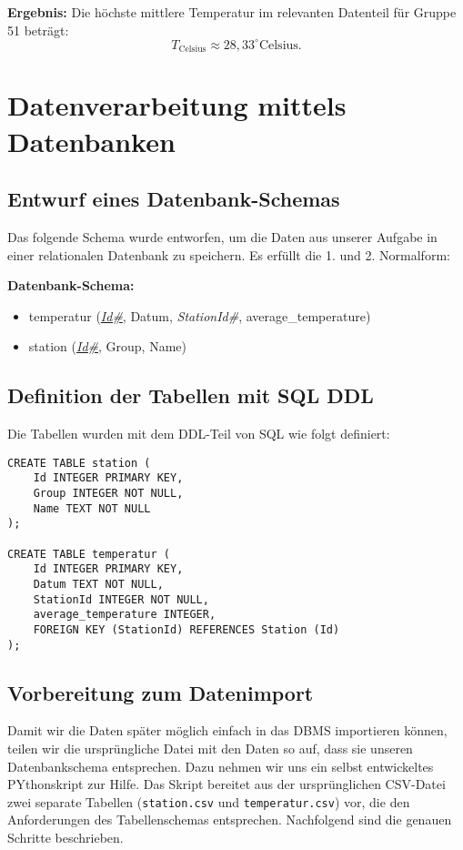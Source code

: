 \documentclass[a4paper,12pt]{article}
\begin{document}
\textbf{Ergebnis:}
Die höchste mittlere Temperatur im relevanten Datenteil für Gruppe 51 beträgt:
\[
T_{\text{Celsius}} \approx 28,33^\circ \text{Celsius}.
\]

\newpage

\section{Datenverarbeitung mittels Datenbanken}

\subsection{Entwurf eines Datenbank-Schemas}
Das folgende Schema wurde entworfen, um die Daten aus unserer Aufgabe in einer relationalen Datenbank zu speichern. Es erfüllt die 1. und 2. Normalform:

\textbf{Datenbank-Schema:}
\begin{itemize}
    \item temperatur (\underline{\textit{Id\#}}, Datum, \textit{StationId\#}, average\_temperature)
    \item station (\underline{\textit{Id\#}}, Group, Name)
\end{itemize}

\subsection{Definition der Tabellen mit SQL DDL}
Die Tabellen wurden mit dem DDL-Teil von SQL wie folgt definiert:

\begin{verbatim}
CREATE TABLE station (
    Id INTEGER PRIMARY KEY,
    Group INTEGER NOT NULL,
    Name TEXT NOT NULL
);

CREATE TABLE temperatur (
    Id INTEGER PRIMARY KEY,
    Datum TEXT NOT NULL,
    StationId INTEGER NOT NULL,
    average_temperature INTEGER,
    FOREIGN KEY (StationId) REFERENCES Station (Id)
);
\end{verbatim}

\subsection{Vorbereitung zum Datenimport}

Damit wir die Daten später möglich einfach in das DBMS importieren können, teilen wir die ursprüngliche Datei mit den Daten so auf, dass sie unseren Datenbankschema entsprechen. Dazu nehmen wir uns ein selbst entwickeltes PYthonskript zur Hilfe. Das Skript bereitet aus der ursprünglichen CSV-Datei zwei separate Tabellen (\texttt{station.csv} und \texttt{temperatur.csv}) vor, die den Anforderungen des Tabellenschemas entsprechen. Nachfolgend sind die genauen Schritte beschrieben.
\end{document}
